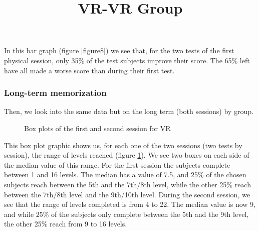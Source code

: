 \documentclass[12pt, openany, twocolumn]{article}
\begin{document}
            In this bar graph (figure \ref{figure8}) we see that, for the two tests of the first physical session, only 35\% of the test subjects improve their score. 
            The 65\% left have all made a worse score than during their first test.
       
        \subsubsection{Long-term memorization}
        Then, we look into the same data but on the long term (both sessions) by group.
        \\
    
            \noindent \title{\textbf{VR-VR Group}}
                \begin{figure}[H]
                    \centering
                    \setlength{\fboxsep}{0pt}
                    \caption{Box plots of the first and second session for VR}
                    \label{figure9}
                \end{figure}

            This box plot graphic shows us, for each one of the two sessions (two tests by session), the range of levels reached (figure \ref{figure9}).
            We see two boxes on each side of the median value of this range.
            For the first session the subjects complete between 1 and 16 levels.
            The median has a value of 7.5, and 25\% of the chosen subjects reach between the 5th and the 7th/8th level, while the other 25\% reach between the 7th/8th level and the 9th/10th level.
            During the second session, we see that the range of levels completed is from 4 to 22. The median value is now 9, and while 25\% of the subjects only complete between the 5th and the 9th level, the other 25\% reach from 9 to 16 levels.
            
\end{document}
